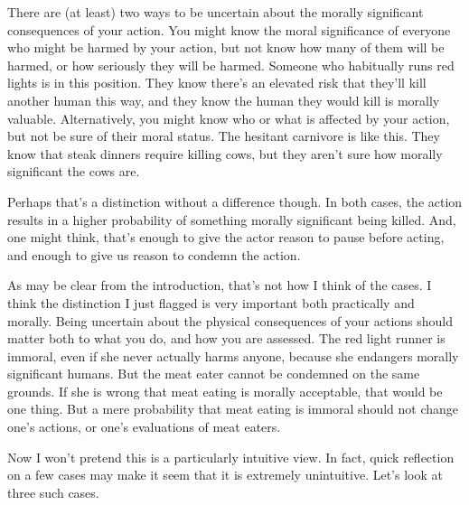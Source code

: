 There are (at least) two ways to be uncertain about the morally significant consequences of your action. You might know the moral significance of everyone who might be harmed by your action, but not know how many of them will be harmed, or how seriously they will be harmed. Someone who habitually runs red lights is in this position. They know there's an elevated risk that they'll kill another human this way, and they know the human they would kill is morally valuable. Alternatively, you might know who or what is affected by your action, but not be sure of their moral status. The hesitant carnivore is like this. They know that steak dinners require killing cows, but they aren't sure how morally significant the cows are.

Perhaps that's a distinction without a difference though. In both cases, the action results in a higher probability of something morally significant being killed. And, one might think, that's enough to give the actor reason to pause before acting, and enough to give us reason to condemn the action.

As may be clear from the introduction, that's not how I think of the cases. I think the distinction I just flagged is very important both practically and morally. Being uncertain about the physical consequences of your actions should matter both to what you do, and how you are assessed. The red light runner is immoral, even if she never actually harms anyone, because she endangers morally significant humans. But the meat eater cannot be condemned on the same grounds. If she is wrong that meat eating is morally acceptable, that would be one thing. But a mere probability that meat eating is immoral should not change one's actions, or one's evaluations of meat eaters.

Now I won't pretend this is a particularly intuitive view. In fact, quick reflection on a few cases may make it seem that it is extremely unintuitive. Let's look at three such cases.

